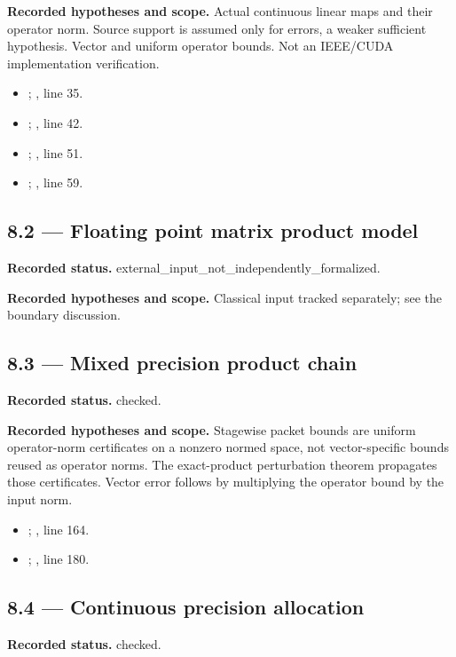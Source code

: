 \textbf{Recorded hypotheses and scope.} Actual continuous linear maps and their operator norm. Source support is assumed only for errors, a weaker sufficient hypothesis. Vector and uniform operator bounds. Not an IEEE/CUDA implementation verification.

\begin{itemize}
\item {}; , line 35.
\item {}; , line 42.
\item {}; , line 51.
\item {}; , line 59.
\end{itemize}
\subsection{8.2 — Floating point matrix product model}
\label{result:8.2}
\textbf{Recorded status.} external\_input\_not\_independently\_formalized.

\textbf{Recorded hypotheses and scope.} Classical input tracked separately; see the boundary discussion.

\subsection{8.3 — Mixed precision product chain}
\label{result:8.3}
\textbf{Recorded status.} checked.

\textbf{Recorded hypotheses and scope.} Stagewise packet bounds are uniform operator-norm certificates on a nonzero normed space, not vector-specific bounds reused as operator norms. The exact-product perturbation theorem propagates those certificates. Vector error follows by multiplying the operator bound by the input norm.

\begin{itemize}
\item {}; , line 164.
\item {}; , line 180.
\end{itemize}
\subsection{8.4 — Continuous precision allocation}
\label{result:8.4}
\textbf{Recorded status.} checked.

